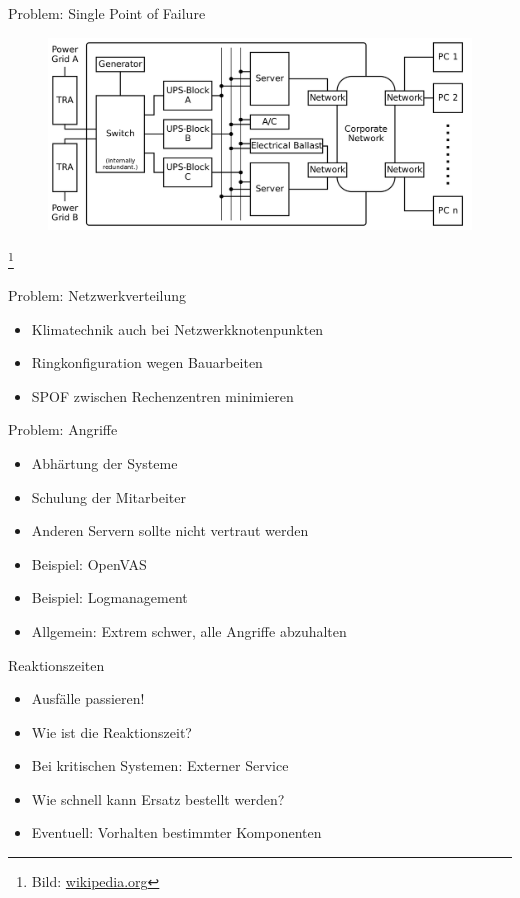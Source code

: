 \documentclass[10pt]{beamer}
\newcommand\blfootnote[1]{%
	\begingroup
	\renewcommand\thefootnote{}\footnote{#1}%
	\addtocounter{footnote}{-1}%
	\endgroup
}
\begin{document}
\begin{frame}[fragile]{Problem: Single Point of Failure}
\begin{figure}
	\includegraphics[width=1\textwidth]{images/spof3}
\end{figure}
\blfootnote{Bild: \href{https://de.wikipedia.org/wiki/Single_Point_of_Failure}{wikipedia.org}}
\end{frame}

%
%
\begin{frame}[fragile]{Problem: Netzwerkverteilung}
	\begin{itemize}
	\item Klimatechnik auch bei Netzwerkknotenpunkten
	\item Ringkonfiguration wegen Bauarbeiten
	\item SPOF zwischen Rechenzentren minimieren
\end{itemize}
\end{frame}

%
%
\begin{frame}[fragile]{Problem: Angriffe}
	\begin{itemize}
		\item Abhärtung der Systeme
		\item Schulung der Mitarbeiter
		\item Anderen Servern sollte nicht vertraut werden
		\item Beispiel: OpenVAS
		\item Beispiel: Logmanagement
		\item Allgemein: Extrem schwer, alle Angriffe abzuhalten
\end{itemize}
\end{frame}

%
%
\begin{frame}[fragile]{Reaktionszeiten}
	\begin{itemize}
	\item Ausfälle passieren!
\item Wie ist die Reaktionszeit?
\item Bei kritischen Systemen: Externer Service
\item Wie schnell kann Ersatz bestellt werden?
\item Eventuell: Vorhalten bestimmter Komponenten
\end{itemize}
\end{frame}
\end{document}
